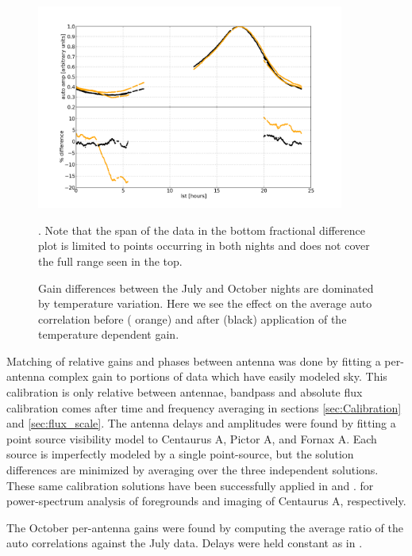 \documentclass[preprint]{aastex}
\begin{document}
\begin{figure}
\includegraphics[width=0.9\textwidth]{plots/auto_balance.png}
\caption{Gain differences between the July and October nights are dominated by temperature variation. Here we see the effect on 
the average auto correlation before ({\color{orange} orange}) and after (black) application of the temperature dependent gain. \label{fig:auto_compare}}.   Note that the span of the data in the bottom fractional difference plot is limited to points occurring in both nights and does not cover the full range seen in the top.
\end{figure}


Matching of relative gains and phases between antenna was done by fitting a per-antenna complex gain to portions
of data which have easily modeled sky. 
This calibration is only relative between antennae, bandpass and absolute flux calibration
comes after time and frequency averaging in sections \ref{sec:Calibration} and \ref{sec:flux_scale}.   
The antenna delays and amplitudes were found by fitting a point source visibility
model to Centaurus A, Pictor A, and Fornax A.  Each source is imperfectly
modeled by a single point-source, but the solution differences are minimized by
averaging over the three independent solutions. These same calibration
solutions have been successfully applied in \citet{Pober:2013p9942} and \citet{Stefan:2013p9926}.
for power-spectrum analysis of foregrounds and imaging of Centaurus A, respectively.  

The October per-antenna gains were found by computing the average ratio of the auto correlations
against the July data. Delays were held constant as in \citet{Jacobs:2011p8438}. 


\end{document}
